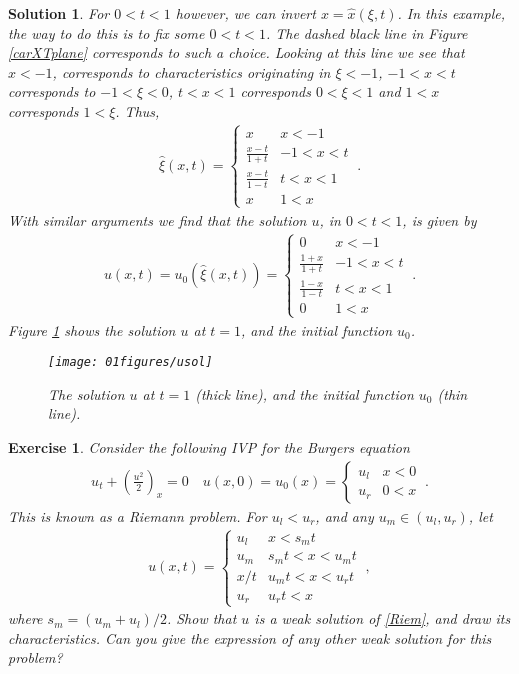 \documentclass[10pt,letterpaper]{article}
\newcommand{\rb}[1]{ \left(  {#1} \right) }
\newcommand{\frb}[1]{ \left(  {#1} \right) }
\theoremstyle{break}
\newtheorem{exercise}{Exercise}
\newtheorem{solution}{Solution}
\begin{document}
\begin{solution}
	For $0<t<1$ however, we can invert $x=\hat x\frb{\xi,t}$.
	In this example, the way to do this is to fix some $0<t<1$.
	The dashed black line in Figure \ref{carXTplane} corresponds to such a choice.
	Looking at this line we see that $x<-1$, corresponds to characteristics originating in $\xi<-1$, $-1<x<t$ corresponds to $-1<\xi<0$, $t<x<1$ corresponds $0<\xi<1$ and $1<x$ corresponds $1<\xi$.
	Thus,
	\begin{gather}
		\hat \xi(x,t)=\begin{cases}
				x 	& 	  x<-1\\
				\frac{x-t}{1+t}  	& -1 < x<t\\
				\frac{x-t}{1-t} 	&  t< x<1\\
				x 	&  1 < x
			\end{cases}\ .
	\end{gather}
	With similar arguments we find that the solution $u$, in $0<t<1$, is given by
	\begin{gather}
		u(x,t)=u_0\frb{\hat\xi(x,t)}=
			\begin{cases}
				0 	& 	  x<-1\\
				\frac{1+x}{1+t}  	& -1 < x<t\\
				\frac{1-x}{1-t} 	&  t< x<1\\
				0 	&  1 < x
			\end{cases}\ .
	\end{gather}
	Figure \ref{u01} shows the solution $u$ at $t=1$, and the initial function $u_0$.
	\begin{figure}
	\centering
	\texttt{[image: 01figures/usol]}
	\caption{The solution $u$ at $t=1$ (thick line), and the initial function $u_0$ (thin line).}
	\label{u01}
	\end{figure}
\end{solution}





\begin{exercise}
	Consider the following IVP for the Burgers equation
	\begin{gather} \label{Riem}
		u_t+\rb{\frac{u^2}{2}}_x=0
		\quad
		u(x,0)=u_0(x)=\begin{cases}
				u_l & x<0\\
				u_r & 0<x
			\end{cases}\ .
	\end{gather}%
	This is known as a \emph{Riemann problem}. 
	For $u_l<u_r$, and any $u_m\in\rb{u_l,u_r}$, let
	\begin{gather}%
		u(x,t)=\begin{cases}
				u_l & x<s_mt\\
				u_m & s_mt<x<u_mt\\
				x/t & u_mt<x<u_rt\\
				u_r & u_rt<x
			\end{cases}\ ,
	\end{gather}%
	where $s_m=(u_m+u_l)/2$.
	Show that $u$ is a weak solution of \eqref{Riem}, and draw its characteristics.
	Can you give the expression of any other weak solution for this problem?
\end{exercise}
\end{document}
